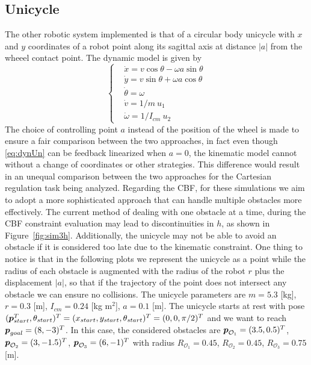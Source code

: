 \subsection{Unicycle}
The other robotic system implemented is that of a circular body unicycle with $x$ and $y$ coordinates of a robot point along its sagittal axis at distance $|a|$ from the wheeel contact point. The dynamic model is given by
\begin{equation}
\left\{ \begin{aligned} \label{eq:dynUn}
    &\dot{x}      = v\cos\theta -\omega a\sin\theta \\
    &\dot{y}      =  v\sin\theta +\omega a\cos\theta \\
    &\dot{\theta} =  \omega \\
    &\dot{v}      =   1/m~u_1 \\
    &\dot{\omega}   = 1/I_{cm}~u_2 
\end{aligned} \right.
\end{equation}
\noindent
The choice of controlling point $a$ instead of the position of the wheel is made to ensure a fair comparison between the two approaches, in fact even though \eqref{eq:dynUn} can be feedback linearized when $a=0$, the kinematic model cannot without a change of coordinates or other strategies. This difference would result in an unequal comparison between the two approaches for the Cartesian regulation task being analyzed.
Regarding the CBF, for these simulations we aim to adopt a more sophisticated approach that can handle multiple obstacles more effectively. The current method of dealing with one obstacle at a time, during the CBF constraint evaluation may lead to discontinuities in $h$, as shown in Figure~\ref{fig:sim3h}. Additionally, the unicycle may not be able to avoid an obstacle if it is considered too late due to the kinematic constraint. One thing to notice is that in the following plots we represent the unicycle as a point while the radius of each obstacle is augmented with the radius of the robot $r$ plus the displacement $|a|$, so that if the trajectory of the point does not intersect any obstacle we can ensure no collisions. The unicycle parameters are $m=5.3$ [kg], $r=0.3$ [m], $I_{cm}=0.24$ [kg $\text{m}^2$], $a=0.1$ [m]. The unicycle starts at rest with pose $(\boldsymbol{p}_{start}^T,\theta_{start})^T=(x_{start},y_{start},\theta_{start})^T = (0,0,\pi/2)^T$ and we want to reach $\boldsymbol{p}_{goal}=(8,-3)^T$. In this case, the considered obstacles are $\boldsymbol{p}_{\mathcal{O}_1}=(3.5,0.5)^T$, $\boldsymbol{p}_{\mathcal{O}_2}=(3,-1.5)^T$, $\boldsymbol{p}_{\mathcal{O}_3}=(6,-1)^T$ with radius $R_{\mathcal{O}_1}=0.45$, $R_{\mathcal{O}_2}=0.45$, $R_{\mathcal{O}_3}=0.75$ [m].

